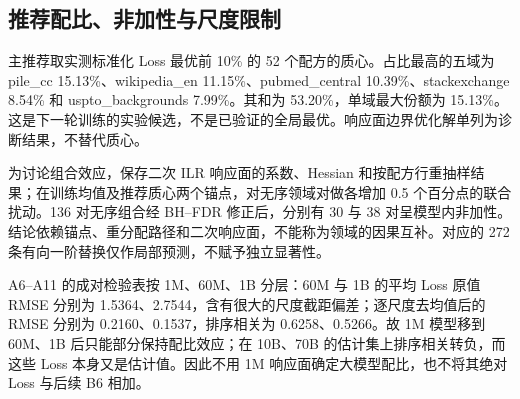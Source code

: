 \subsection{推荐配比、非加性与尺度限制}
主推荐取实测标准化 Loss 最优前 10\% 的 52 个配方的质心。占比最高的五域为 pile\_cc 15.13\%、wikipedia\_en 11.15\%、pubmed\_central 10.39\%、stackexchange 8.54\% 和 uspto\_backgrounds 7.99\%。其和为 53.20\%，单域最大份额为 15.13\%。这是下一轮训练的实验候选，不是已验证的全局最优。响应面边界优化解单列为诊断结果，不替代质心。

为讨论组合效应，保存二次 ILR 响应面的系数、Hessian 和按配方行重抽样结果；在训练均值及推荐质心两个锚点，对无序领域对做各增加 0.5 个百分点的联合扰动。136 对无序组合经 BH--FDR 修正后，分别有 30 与 38 对呈模型内非加性。结论依赖锚点、重分配路径和二次响应面，不能称为领域的因果互补。对应的 272 条有向一阶替换仅作局部预测，不赋予独立显著性。

A6--A11 的成对检验表按 1M、60M、1B 分层：60M 与 1B 的平均 Loss 原值 RMSE 分别为 1.5364、2.7544，含有很大的尺度截距偏差；逐尺度去均值后的 RMSE 分别为 0.2160、0.1537，排序相关为 0.6258、0.5266。故 1M 模型移到 60M、1B 后只能部分保持配比效应；在 10B、70B 的估计集上排序相关转负，而这些 Loss 本身又是估计值。因此不用 1M 响应面确定大模型配比，也不将其绝对 Loss 与后续 B6 相加。
